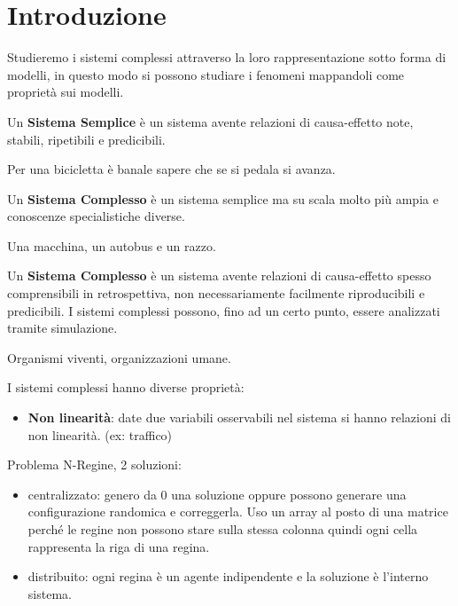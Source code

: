 \chapter{Introduzione}
Studieremo i sistemi complessi attraverso la loro rappresentazione sotto forma di
modelli, in questo modo si possono studiare i fenomeni mappandoli come proprietà
sui modelli.

\begin{definizione} 
    Un \textbf{Sistema Semplice} è un sistema avente relazioni di causa-effetto
    note, stabili, ripetibili e predicibili.
\end{definizione}
\begin{esempio}
    Per una bicicletta è banale sapere che se si pedala si avanza.
\end{esempio}
\begin{definizione} 
    Un \textbf{Sistema Complesso} è un sistema semplice ma su scala molto più
    ampia e conoscenze specialistiche diverse.
\end{definizione}
\begin{esempio}
    Una macchina, un autobus e un razzo.
\end{esempio}
\begin{definizione} 
    Un \textbf{Sistema Complesso} è un sistema avente relazioni di causa-effetto
    spesso comprensibili in retrospettiva, non necessariamente facilmente
    riproducibili e predicibili. I sistemi complessi possono, fino ad un certo 
    punto, essere analizzati tramite simulazione.
\end{definizione}
\begin{esempio}
    Organismi viventi, organizzazioni umane.
\end{esempio}

I sistemi complessi hanno diverse proprietà:
\begin{itemize}
    \item \textbf{Non linearità}: date due variabili osservabili nel sistema
          si hanno relazioni di non linearità. (ex: traffico)
\end{itemize}

Problema N-Regine, 2 soluzioni:
\begin{itemize}
    \item centralizzato: genero da 0 una soluzione oppure possono generare una
          configurazione randomica e correggerla. Uso un array al posto di una matrice
          perché le regine non possono stare sulla stessa colonna quindi ogni cella
          rappresenta la riga di una regina.
    \item distribuito: ogni regina è un agente indipendente e la soluzione è l'interno
          sistema.
\end{itemize}

